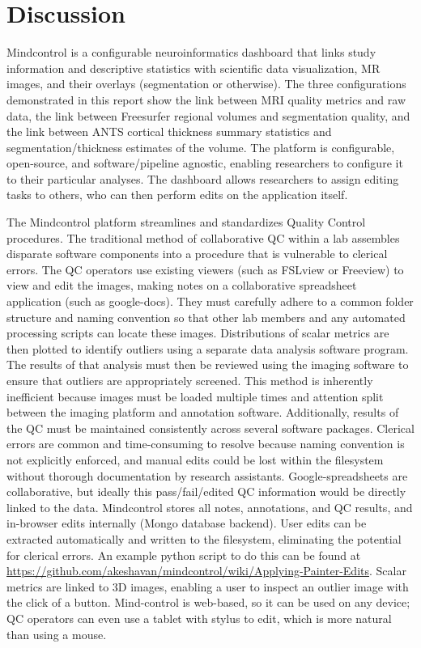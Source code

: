 \section{Discussion}

Mindcontrol is a configurable neuroinformatics dashboard that links study information and descriptive statistics with scientific data visualization, MR images, and their overlays (segmentation or otherwise). The three configurations demonstrated in this report show the link between MRI quality metrics and raw data, the link between Freesurfer regional volumes and segmentation quality, and the link between ANTS cortical thickness summary statistics and segmentation/thickness estimates of the volume. The platform is configurable, open-source, and software/pipeline agnostic, enabling researchers to configure it to their particular analyses. The dashboard allows researchers to assign editing tasks to others, who can then perform edits on the application itself. 

The Mindcontrol platform streamlines and standardizes Quality Control procedures. The traditional method of collaborative QC within a lab assembles disparate software components into a procedure that is vulnerable to clerical errors. The QC operators use existing viewers (such as FSLview or Freeview) to view and edit the images, making notes on a collaborative spreadsheet application (such as google-docs). They must carefully adhere to a common folder structure and naming convention so that other lab members and any automated processing scripts can locate these images. Distributions of scalar metrics are then plotted to identify outliers using a separate data analysis software program. The results of that analysis must then be reviewed using the imaging software to ensure that outliers are appropriately screened. This method is inherently inefficient because images must be loaded multiple times and attention split between the imaging platform and annotation software. Additionally, results of the QC must be maintained consistently across several software packages. Clerical errors are common and time-consuming to resolve because naming convention is not explicitly enforced, and manual edits could be lost within the filesystem without thorough documentation by research assistants. Google-spreadsheets are collaborative, but ideally this pass/fail/edited QC information would be directly linked to the data. Mindcontrol stores all notes, annotations, and QC results, and in-browser edits internally (Mongo database backend). User edits can be extracted automatically and written to the filesystem, eliminating the potential for clerical errors. An example python script to do this can be found at \href{http://}{https://github.com/akeshavan/mindcontrol/wiki/Applying-Painter-Edits}. Scalar metrics are linked to 3D images, enabling a user to inspect an outlier image with the click of a button. Mind-control is web-based, so it can be used on any device; QC operators can even use a tablet with stylus to edit, which is more natural than using a mouse.


